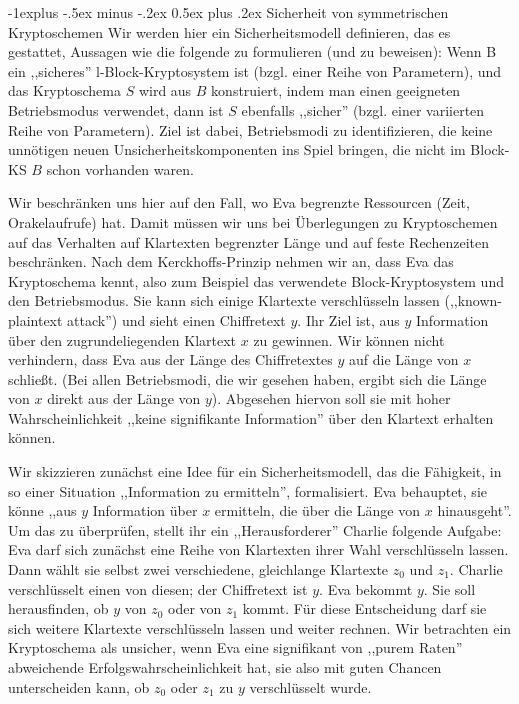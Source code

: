 \documentclass[a4paper]{article}
\makeatletter
\renewcommand{\subsection}{\@startsection{subsection}{2}{0mm}%
 {-1explus -.5ex minus -.2ex}%
 {0.5ex plus .2ex}%
 {\normalfont\normalsize\bfseries}}
\makeatother
\begin{document}
\begin{multicols}{3}
    \subsection{Sicherheit von symmetrischen Kryptoschemen}
    Wir werden hier ein Sicherheitsmodell definieren, das es gestattet, Aussagen wie die folgende zu formulieren (und zu beweisen): Wenn B ein ,,sicheres'' l-Block-Kryptosystem ist (bzgl. einer Reihe von Parametern), und das Kryptoschema $S$ wird aus $B$ konstruiert, indem man einen geeigneten Betriebsmodus verwendet, dann ist $S$ ebenfalls ,,sicher'' (bzgl. einer variierten Reihe von Parametern). Ziel ist dabei, Betriebsmodi zu identifizieren, die keine unnötigen neuen Unsicherheitskomponenten ins Spiel bringen, die nicht im Block-KS
    $B$ schon vorhanden waren.

    Wir beschränken uns hier auf den Fall, wo Eva begrenzte Ressourcen (Zeit, Orakelaufrufe) hat. Damit müssen wir uns bei Überlegungen zu Kryptoschemen auf das Verhalten auf Klartexten begrenzter Länge und auf feste Rechenzeiten beschränken. Nach dem Kerckhoffs-Prinzip nehmen wir an, dass Eva das Kryptoschema kennt, also zum Beispiel das verwendete Block-Kryptosystem und den Betriebsmodus. Sie kann sich einige Klartexte verschlüsseln lassen (,,known-plaintext attack'') und sieht einen Chiffretext $y$. Ihr Ziel ist, aus $y$ Information über den zugrundeliegenden Klartext $x$ zu gewinnen. Wir können nicht verhindern, dass Eva aus der Länge des Chiffretextes $y$ auf die Länge von $x$ schließt. (Bei allen Betriebsmodi, die wir gesehen haben, ergibt sich die Länge von $x$ direkt aus der Länge von $y$). Abgesehen hiervon soll sie mit hoher Wahrscheinlichkeit ,,keine signifikante Information'' über den Klartext erhalten können.

    Wir skizzieren zunächst eine Idee für ein Sicherheitsmodell, das die Fähigkeit, in so einer Situation ,,Information zu ermitteln'', formalisiert. Eva behauptet, sie könne ,,aus $y$ Information über $x$ ermitteln, die über die Länge von $x$ hinausgeht''. Um das zu überprüfen, stellt ihr ein ,,Herausforderer'' Charlie folgende Aufgabe: Eva darf sich zunächst eine Reihe von Klartexten ihrer Wahl verschlüsseln lassen. Dann wählt sie selbst zwei verschiedene, gleichlange Klartexte $z_0$ und $z_1$.  Charlie verschlüsselt einen von diesen; der Chiffretext ist $y$. Eva bekommt $y$. Sie soll herausfinden, ob $y$ von $z_0$ oder von $z_1$ kommt. Für diese Entscheidung darf sie sich weitere Klartexte verschlüsseln lassen und weiter rechnen. Wir betrachten ein Kryptoschema als unsicher, wenn Eva eine signifikant von ,,purem Raten'' abweichende Erfolgswahrscheinlichkeit hat, sie also mit guten Chancen unterscheiden kann, ob $z_0$ oder $z_1$ zu $y$ verschlüsselt wurde.


\end{multicols}
\end{document}

